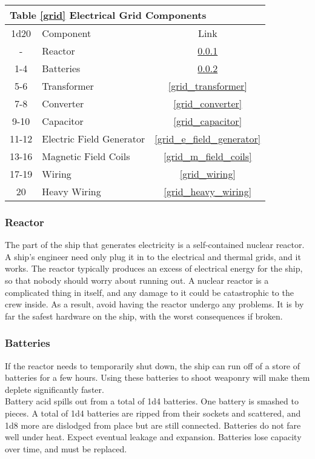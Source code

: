 \documentclass[a4paper]{article}
\begin{document}
\vspace{0.5cm} \hspace{0.25\linewidth}
\begin{tabular}{@{} | c | l | c | @{}}
\toprule
\multicolumn{3}{|l|}{Table \ref{grid} Electrical Grid Components} \\
\toprule
1d20 & Component & Link \\
\midrule
- & Reactor & \ref{grid_reactor} \\
1-4 & Batteries & \ref{grid_batteries} \\
5-6 & Transformer & \ref{grid_transformer} \\
7-8 & Converter & \ref{grid_converter} \\
9-10 & Capacitor & \ref{grid_capacitor} \\
11-12 & Electric Field Generator & \ref{grid_e_field_generator} \\
13-16 & Magnetic Field Coils & \ref{grid_m_field_coils} \\
17-19 & Wiring & \ref{grid_wiring} \\
20 & Heavy Wiring & \ref{grid_heavy_wiring} \\
\bottomrule
\end{tabular}

\hspace{-18pt} \subsubsection{Reactor} \label{grid_reactor} \vspace{-0.2cm}
The part of the ship that generates electricity is a self-contained nuclear reactor. A ship's engineer need only plug it in to the electrical and thermal grids, and it works. The reactor typically produces an excess of electrical energy for the ship, so that nobody should worry about running out. A nuclear reactor is a complicated thing in itself, and any damage to it could be catastrophic to the crew inside. As a result, avoid having the reactor undergo any problems. It is by far the safest hardware on the ship, with the worst consequences if broken.

\vspace{-0.5cm} \hspace{-18pt} \subsubsection{Batteries} \label{grid_batteries} \vspace{-0.2cm}
If the reactor needs to temporarily shut down, the ship can run off of a store of batteries for a few hours. Using these batteries to shoot weaponry will make them deplete significantly faster.
\\ \pbhw
{Battery acid spills out from a total of 1d4 batteries.}
{One battery is smashed to pieces. A total of 1d4 batteries are ripped from their sockets and scattered, and 1d8 more are dislodged from place but are still connected.}
{Batteries do not fare well under heat. Expect eventual leakage and expansion.}
{Batteries lose capacity over time, and must be replaced.}
\end{document}
